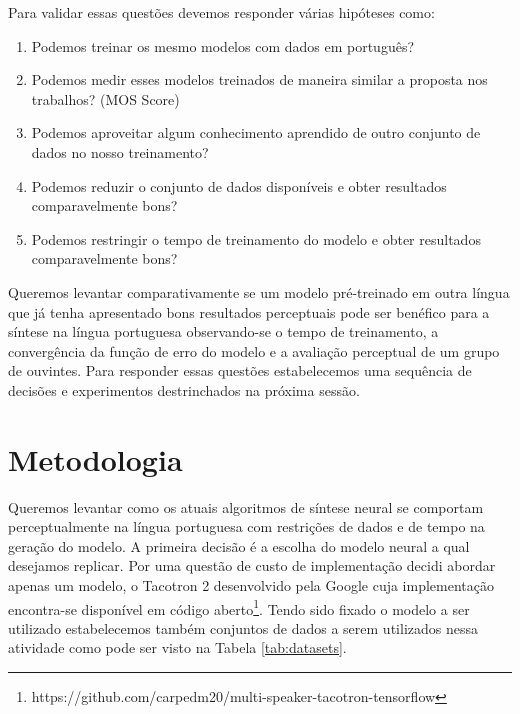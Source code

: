 \documentclass{article}
\begin{document}
Para validar essas questões devemos responder várias hipóteses como:

\begin{enumerate}
	\item \label{it:h1} Podemos treinar os mesmo modelos com dados em português?
	\item \label{it:h2} Podemos medir esses modelos treinados de maneira similar a proposta nos trabalhos? (MOS Score)
	\item \label{it:h3} Podemos aproveitar algum conhecimento aprendido de outro conjunto de dados no nosso treinamento? 
	\item \label{it:h4} Podemos reduzir o conjunto de dados disponíveis e obter resultados comparavelmente bons?
	\item \label{it:h5} Podemos restringir o tempo de treinamento do modelo e obter resultados comparavelmente bons?
\end{enumerate}

Queremos levantar comparativamente se um modelo pré-treinado em outra língua que já tenha apresentado bons resultados perceptuais pode ser benéfico para a síntese na língua portuguesa observando-se o tempo de treinamento, a convergência da função de erro do modelo e a avaliação perceptual de um grupo de ouvintes.
Para responder essas questões estabelecemos uma sequência de decisões e experimentos destrinchados na próxima sessão.

\section{Metodologia}

Queremos levantar como os atuais algoritmos de síntese neural se comportam perceptualmente na língua portuguesa com restrições de dados e de tempo na geração do modelo. 
A primeira decisão é a escolha do modelo neural a qual desejamos replicar. 
Por uma questão de custo de implementação decidi abordar apenas um modelo, o Tacotron 2 \cite{tacotron2:DBLP:journals/corr/abs-1712-05884} desenvolvido pela Google cuja implementação encontra-se disponível em código aberto\footnote{https://github.com/carpedm20/multi-speaker-tacotron-tensorflow}.
Tendo sido fixado o modelo a ser utilizado estabelecemos também conjuntos de dados a serem utilizados nessa atividade como pode ser visto na Tabela \ref{tab:datasets}.
\end{document}
